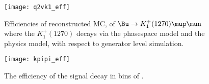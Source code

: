 



\begin{figure}[h]
  \begin{center}
    \texttt{[image: q2vk1\_eff]}
    \caption{\small Efficiencies of reconstructed MC, of $\Bu\to K_1^+(1270) \mup\mun$
      where the $K_1^+(1270)$ decays via the phasespace model and the physics model,
    with respect to generator level simulation.}
    \label{fig:q2vk1eff}
  \end{center}
\end{figure}


\begin{figure}
  \begin{center}
    \texttt{[image: kpipi\_eff]}
    \caption{\small
      The efficiency of the signal decay \btokphimumu in bins of \qsq.
    }
    \label{fig:hhh:phikeff}
  \end{center}
\end{figure}


